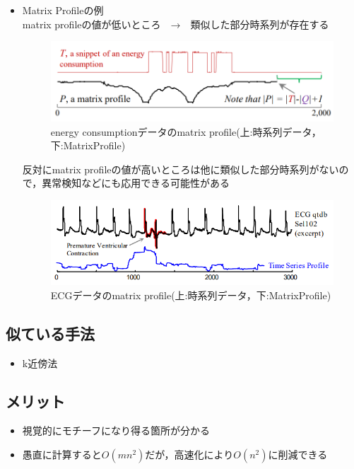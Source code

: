 \documentclass{jsarticle}
\begin{document}
\begin{itemize}
	\item Matrix Profileの例\\
	matrix profileの値が低いところ　→　類似した部分時系列が存在する\\
\begin{figure}[h]
	\begin{center}
		\includegraphics[scale = 0.50]{matrix_profile_fig3.png}
	\end{center}
	\caption{energy consumptionデータのmatrix profile(上:時系列データ，下:MatrixProfile)}
\end{figure}


	反対にmatrix profileの値が高いところは他に類似した部分時系列がないので，異常検知などにも応用できる可能性がある
\begin{figure}[h]
	\begin{center}
		\includegraphics[scale = 0.6]{matrix_profile_fig13.png}
	\end{center}
	\caption{ECGデータのmatrix profile(上:時系列データ，下:MatrixProfile)}
\end{figure}
\end{itemize}


\subsection{似ている手法}
\begin{itemize}
	\item k近傍法
\end{itemize}

\subsection{メリット}
\begin{itemize}
	\item 視覚的にモチーフになり得る箇所が分かる
	\item 愚直に計算すると$O(mn^2)$だが，高速化により$O(n^2)$に削減できる
\end{itemize}
\end{document}
